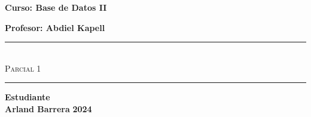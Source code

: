 \begin{titlepage}
\begin{center}
      {\Large \textbf{Curso: Base de Datos II}}\medskip
      
      {\Large \textbf{Profesor: Abdiel Kapell}}

      \rule{\linewidth}{0.75mm}\\
          {\Large \textsc{Parcial 1}} 
      \rule{\linewidth}{0.75mm}\medskip

      {\Large \textbf{Estudiante}}\\
      \vspace{5mm}
      {\Large \textbf{Arland Barrera}}
      \vfill
      {\Huge \textbf{2024}}

  \end{center}
\end{titlepage}